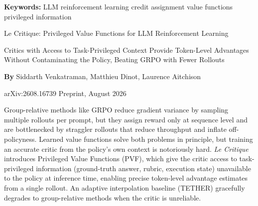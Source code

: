 \documentclass[10pt,twocolumn]{article}
\begin{document}
\setlength{\parindent}{0pt}
\setlength{\parskip}{4pt}

{\small\color{keywordgray}\textbf{Keywords:}
  LLM reinforcement learning \textbullet{}
  credit assignment \textbullet{}
  value functions \textbullet{}
  privileged information}\par\vspace{4pt}

{\LARGE\bfseries\raggedright
  Le Critique: Privileged Value Functions
  for LLM Reinforcement Learning}\par\vspace{4pt}

{\large\itshape\raggedright
  Critics with Access to Task-Privileged Context Provide
  Token-Level Advantages Without Contaminating the Policy,
  Beating GRPO with Fewer Rollouts}\par\vspace{6pt}

{\small\textbf{By} Siddarth Venkatraman, Matthieu Dinot,
  Laurence Aitchison}\par\vspace{2pt}

{\small\color{keywordgray}arXiv:2608.16739 \textbullet{} Preprint, August 2026}
\par\vspace{2pt}\noindent{\color{rulered}\rule{\columnwidth}{0.6pt}}\vspace{6pt}

Group-relative methods like GRPO reduce gradient variance by sampling
multiple rollouts per prompt, but they assign reward only at sequence
level and are bottlenecked by straggler rollouts that reduce throughput
and inflate off-policyness. Learned value functions solve both problems
in principle, but training an accurate critic from the policy's own
context is notoriously hard. \textit{Le Critique} introduces Privileged
Value Functions (PVF), which give the critic access to task-privileged
information (ground-truth answer, rubric, execution state) unavailable
to the policy at inference time, enabling precise token-level advantage
estimates from a single rollout. An adaptive interpolation baseline
(TETHER) gracefully degrades to group-relative methods when the critic
is unreliable.
\end{document}
